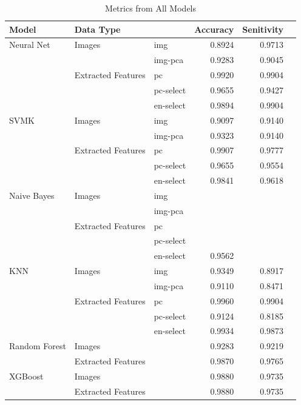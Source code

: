 \documentclass{article}
\begin{document}
\begin{table}[H]
    \centering
        \begin{table}[H]\centering
        \renewcommand{\arraystretch}{1.15}
        \begin{tabular}{lllrrr}\toprule
        Model &Data Type & &Accuracy &Senitivity \\\midrule
        Neural Net &Images &img &0.8924 &0.9713 \\
        & &img-pca &0.9283 &0.9045 \\
        &Extracted Features &pc &0.9920 &0.9904 \\
        & &pc-select &0.9655 &0.9427 \\
        & &en-select &0.9894 &0.9904 \\
        \hline
        SVMK &Images &img &0.9097 &0.9140 \\
        & &img-pca &0.9323 &0.9140 \\
        &Extracted Features &pc &0.9907 &0.9777 \\
        & &pc-select &0.9655 &0.9554 \\
        & &en-select &0.9841 &0.9618 \\
         \hline
        Naive Bayes &Images &img & & \\
        & &img-pca & & \\
        &Extracted Features &pc & & \\
        & &pc-select & & \\
        & &en-select &0.9562 & \\
        \hline
        KNN &Images &img &0.9349 &0.8917 \\
        & &img-pca &0.9110 &0.8471 \\
        &Extracted Features &pc &0.9960 &0.9904 \\
        & &pc-select &0.9124 &0.8185 \\
        & &en-select &0.9934 &0.9873 \\
         \hline
        Random Forest &Images & &0.9283 &0.9219 \\
        &Extracted Features & &0.9870 &0.9765 \\
        \hline
        XGBoost &Images & &0.9880 &0.9735 \\
        &Extracted Features & &0.9880 &0.9735 \\
        \bottomrule
        \end{tabular}
        \end{table}
    \caption{Metrics from All Models}
    \label{all-results}
\end{table}
\end{document}

